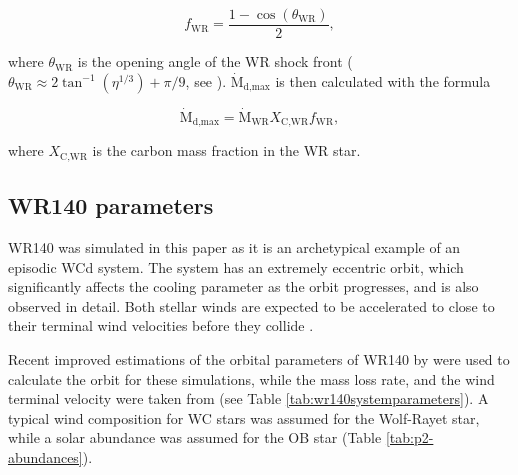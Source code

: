 \documentclass[fleqn,usenatbib]{mnras}
\newcommand{\rms}[1]{\ensuremath{_{\text{#1}}}}
\newcommand{\mdot}{\dot{\text{M}}}
\begin{document}
\begin{equation}
  f\rms{WR} = \frac{1 - \cos\left(\theta\rms{WR}\right)}{2},
\end{equation}

\noindent
where $\theta\rms{WR}$ is the opening angle of the WR shock front ($\theta\rms{WR} \approx 2 \tan^{-1}(\eta^{1/3}) + \pi/9$, see \cite{pittardCollidingStellarWinds2018}).
$\mdot\rms{d,max}$ is then calculated with the formula

\begin{equation}
  \label{eq:p2-maxdustrate}
  \mdot\rms{d,max} = \mdot\rms{WR} X\rms{C,WR} f\rms{WR},
\end{equation}

\noindent
where $X\rms{C,WR}$ is the carbon mass fraction in the WR star.

\subsection{WR140 parameters}

WR140 was simulated in this paper as it is an archetypical example of an episodic WCd system.
The system has an extremely eccentric orbit, which significantly affects the cooling parameter as the orbit progresses, and is also observed in detail.
Both stellar winds are expected to be accelerated to close to their terminal wind velocities before they collide \citep{lamersIntroductionStellarWinds1999}.

Recent improved estimations of the orbital parameters of WR140 by \cite{thomasOrbitStellarMasses2021} were used to calculate the orbit for these simulations, while the mass loss rate, and the wind terminal velocity were taken from \cite{williamsMultifrequencyVariationsWolfrayet1990}
(see Table \ref{tab:wr140systemparameters}).
A typical wind composition for WC stars was assumed for the Wolf-Rayet star, while a solar abundance was assumed for the OB star (Table \ref{tab:p2-abundances}).
\end{document}
